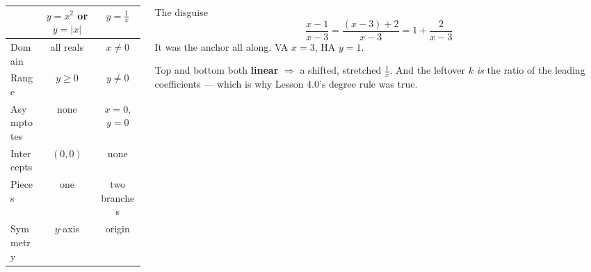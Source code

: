 \documentclass[aspectratio=169, 11pt]{beamer}
\begin{document}
\begin{frame}[t, plain]
  \begin{columns}[T]
    \begin{column}{0.50\textwidth}
      \centering
      \renewcommand{\arraystretch}{1.2}
      {\footnotesize
      \begin{tabular}{|l|c|c|}
      \hline
       & $y=x^2$ or $y=|x|$ & $y=\frac1x$ \\ \hline
      Domain     & all reals & $x\neq0$ \\ \hline
      Range      & $y\ge0$   & $y\neq0$ \\ \hline
      Asymptotes & none      & $x=0$, $y=0$ \\ \hline
      Intercepts & $(0,0)$   & none \\ \hline
      Pieces     & one       & two branches \\ \hline
      Symmetry   & $y$-axis  & origin \\ \hline
      \end{tabular}}
    \end{column}
    \begin{column}{0.46\textwidth}
      \begin{block}{The disguise}
        \[ \frac{x-1}{x-3}=\frac{(x-3)+2}{x-3}=1+\frac{2}{x-3} \]
        It was the anchor all along. VA $x=3$, HA $y=1$.
      \end{block}
      \vspace{3pt}
      {\footnotesize Top and bottom both \textbf{linear} $\Rightarrow$ a shifted, stretched $\frac1x$.
      And the leftover $k$ \emph{is} the ratio of the leading coefficients --- which is why Lesson
      4.0's degree rule was true.}
    \end{column}
  \end{columns}
\end{frame}
\end{document}
